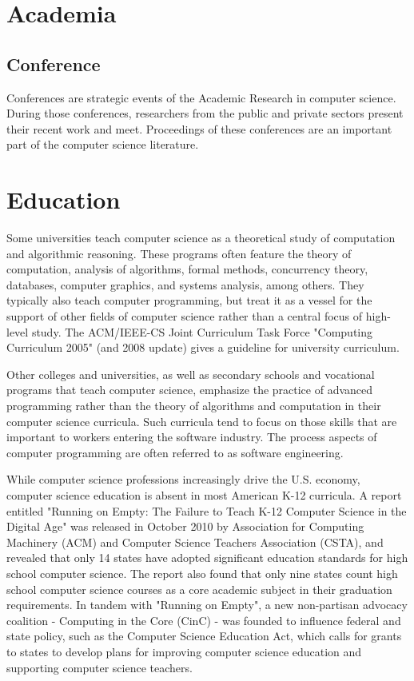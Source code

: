 \chapter{Academia}



\section{Conference}


Conferences are strategic events of the Academic Research in computer science. During those conferences, researchers from the public and private sectors present their recent work and meet. Proceedings of these conferences are an important part of the computer science literature.


\chapter{Education}


Some universities teach computer science as a theoretical study of computation and algorithmic reasoning. These programs often feature the theory of computation, analysis of algorithms, formal methods, concurrency theory, databases, computer graphics, and systems analysis, among others. They typically also teach computer programming, but treat it as a vessel for the support of other fields of computer science rather than a central focus of high-level study. The ACM/IEEE-CS Joint Curriculum Task Force "Computing Curriculum 2005" (and 2008 update)  gives a guideline for university curriculum.

Other colleges and universities, as well as secondary schools and vocational programs that teach computer science, emphasize the practice of advanced programming rather than the theory of algorithms and computation in their computer science curricula. Such curricula tend to focus on those skills that are important to workers entering the software industry. The process aspects of computer programming are often referred to as software engineering.

While computer science professions increasingly drive the U.S. economy, computer science education is absent in most American K-12 curricula. A report entitled "Running on Empty: The Failure to Teach K-12 Computer Science in the Digital Age" was released in October 2010 by Association for Computing Machinery (ACM) and Computer Science Teachers Association (CSTA), and revealed that only 14 states have adopted significant education standards for high school computer science. The report also found that only nine states count high school computer science courses as a core academic subject in their graduation requirements. In tandem with "Running on Empty", a new non-partisan advocacy coalition - Computing in the Core (CinC) - was founded to influence federal and state policy, such as the Computer Science Education Act, which calls for grants to states to develop plans for improving computer science education and supporting computer science teachers.

